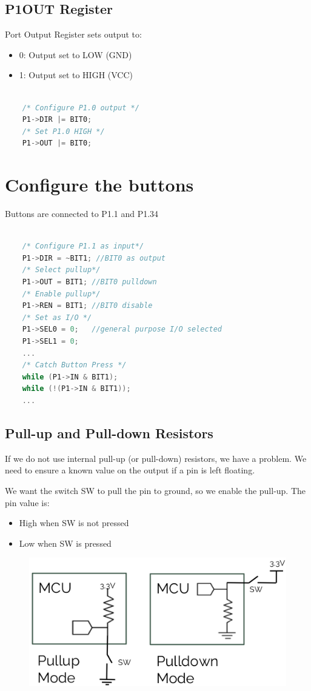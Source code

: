 \subsection{P1OUT Register}

Port Output Register sets output to:

\begin{itemize}
    \item 0: Output set to LOW (GND)
    \item 1: Output set to HIGH (VCC)
\end{itemize}

\begin{lstlisting}[language=c++]

    /* Configure P1.0 output */
    P1->DIR |= BIT0;
    /* Set P1.0 HIGH */
    P1->OUT |= BIT0;
\end{lstlisting}

\section{Configure the buttons}

Buttons are connected to P1.1 and P1.34

\begin{lstlisting}[language=c++]

    /* Configure P1.1 as input*/
    P1->DIR = ~BIT1; //BIT0 as output
    /* Select pullup*/
    P1->OUT = BIT1; //BIT0 pulldown
    /* Enable pullup*/
    P1->REN = BIT1; //BIT0 disable
    /* Set as I/O */
    P1->SEL0 = 0;   //general purpose I/O selected
    P1->SEL1 = 0;
    ...
    /* Catch Button Press */
    while (P1->IN & BIT1);
    while (!(P1->IN & BIT1));
    ...
\end{lstlisting}

\subsection{Pull-up and Pull-down Resistors}

If we do not use internal pull-up (or pull-down) resistors, we have a
problem. We need to ensure a known value on the output if a pin is left floating.

We want the switch SW to pull the pin to ground, so we enable the pull-up. The pin value is:

\begin{itemize}
    \item High when SW is not pressed
    \item Low when SW is pressed
\end{itemize}


\begin{figure}[H]
    \centering
    \includegraphics[width=0.5\linewidth]{img/image61.png}
\end{figure}
